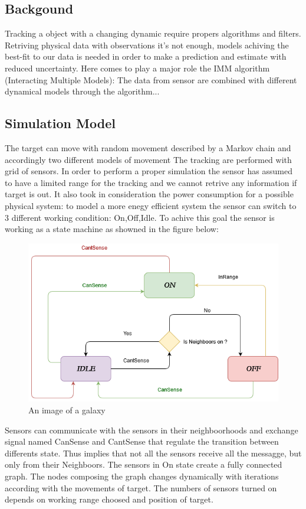 \documentclass{article}
\begin{document}
\begin{multicols}{2}
    \section*{Backgound}
    \justify
        Tracking a object with a changing dynamic require propers algorithms and filters. Retriving physical data with
        observations it's not enough, models achiving the best-fit to our data is needed in order to make a prediction and estimate 
        with reduced uncertainty. Here comes to play a major role the IMM algorithm (Interacting Multiple Models): The data
        from sensor are combined with different dynamical models through the algorithm... 
        \subsection*{Simulation Model}
            The target can move with random movement described by a Markov chain and accordingly two different models of movement
            The tracking are performed with grid of sensors. In order to perform a proper simulation the sensor has assumed to have a limited
            range for the tracking and we cannot retrive any information if target is out. It also took in consideration the power consumption 
            for a possible physical system: to model a more enegy efficient system the sensor can switch to 3 different working condition: On,Off,Idle.
            To achive this goal the sensor is working as a state machine as showned in the figure below: \begin{figure}[htp]
                \centering
                \includegraphics[scale=0.1]{UntitledDiagram.png}
                \caption{An image of a galaxy}
                \label{fig:galaxy}
                \end{figure}
            Sensors can communicate with the sensors in their neighboorhoods and exchange signal named CanSense and CantSense that regulate the transition
            between differents state. Thus implies that not all the sensors receive all the messagge, but only from their Neighboors. The sensors in On state
            create a fully connected graph. The nodes composing the graph changes dynamically with iterations according with the movements of target. The numbers of
            sensors turned on depends on working range choosed and position of target.


\end{multicols}
\end{document}
